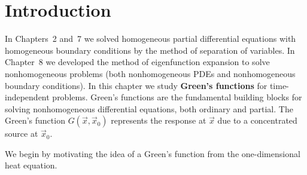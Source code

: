 \section{Introduction}
\label{sec:greens-intro}

In Chapters~2 and~7 we solved homogeneous partial differential equations with homogeneous boundary conditions by the method of separation of variables.  In Chapter~8 we developed the method of eigenfunction expansion to solve nonhomogeneous problems (both nonhomogeneous PDEs and nonhomogeneous boundary conditions).  In this chapter we study \textbf{Green's functions} for time-independent problems.  Green's functions are the fundamental building blocks for solving nonhomogeneous differential equations, both ordinary and partial.  The Green's function $G(\vec{x},\vec{x}_0)$ represents the response at $\vec{x}$ due to a concentrated source at $\vec{x}_0$.

We begin by motivating the idea of a Green's function from the one-dimensional heat equation.
